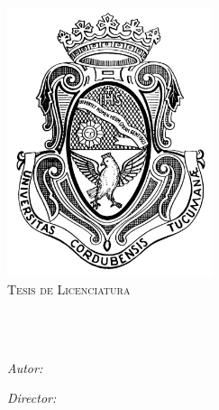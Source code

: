 \documentclass[
12pt, %
spanish,
singlespacing, %
headsepline, %
]{MastersDoctoralThesis} %
\author{Mar\'ia Eugenia Ferraro} %
\begin{document}
\frontmatter %

\pagestyle{plain} %


\begin{titlepage}
\begin{center}

\vspace*{-1cm}
{\scshape\LARGE \univname\par}\vspace{1cm} %
\includegraphics[width=6cm]{Figures/uni.jpg} \\ \medskip %
\textsc{\Large Tesis de Licenciatura}\\[0.5cm] %


\HRule \\[0.4cm] %
{\huge \bfseries \ttitle\par}\vspace{0.4cm} %
\HRule \\[1.5cm] %
 
\begin{minipage}[t]{0.4\textwidth}
\begin{flushleft} \large
\emph{Autor:}\\
\href{http://www.johnsmith.com}{\authorname} %
\end{flushleft}
\end{minipage}
\begin{minipage}[t]{0.4\textwidth}
\begin{flushright} \large
\emph{Director:} \\
\href{http://www.jamessmith.com}{\supname} %
\end{flushright}
\end{minipage}\\[3cm]
 

\end{center}
\end{titlepage}
\end{document}
